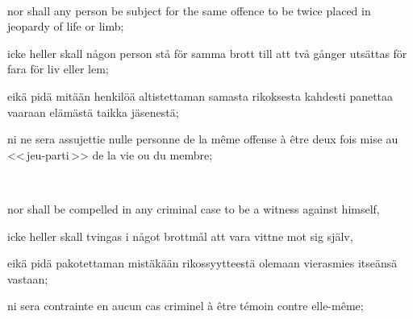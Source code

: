 \documentclass[a4,landscape,12pt]{article}
\begin{document}
~

\begin{minipage}[t]{0.22\textwidth}
nor shall any person be subject for the same offence to be twice placed in jeopardy of life or limb;
\end{minipage}\textwidth
\begin{minipage}[t]{0.22\textwidth}
icke heller skall någon person stå för samma brott till att två gånger utsättas för fara för liv eller lem;
\end{minipage}\textwidth
\begin{minipage}[t]{0.22\textwidth}
eikä pidä mitään henkilöä altistettaman samasta rikoksesta kahdesti panettaa vaaraan elämästä taikka jäsenestä;
\end{minipage}\textwidth
\begin{minipage}[t]{0.22\textwidth}
ni ne sera assujettie nulle personne de la même offense à être deux fois mise au <<\,jeu-parti\,>> de la vie ou du membre;
\end{minipage}

~

\begin{minipage}[t]{0.22\textwidth}
nor shall be compelled in any criminal case to be a witness against himself,
\end{minipage}\textwidth
\begin{minipage}[t]{0.22\textwidth}
 icke heller skall tvingas i något brottmål att vara vittne mot sig själv, 
\end{minipage}\textwidth
\begin{minipage}[t]{0.22\textwidth}
 eikä pidä pakotettaman mistäkään rikossyytteestä olemaan vierasmies itseänsä vastaan;
\end{minipage}\textwidth
\begin{minipage}[t]{0.22\textwidth}
ni sera contrainte en aucun cas criminel à être témoin contre elle-même;
\end{minipage}

~
\end{document}
